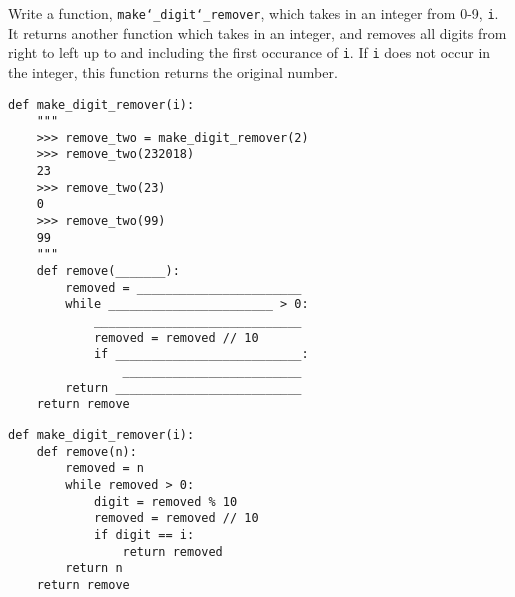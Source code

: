 \begin{blocksection}
\question Write a function, \texttt{make\char`_digit\char`_remover}, which takes in an integer from 0-9, \texttt{i}. It returns another function which takes in an integer, and removes all digits from right to left up to and including the first occurance of \texttt{i}. If \texttt{i} does not occur in the integer, this function returns the original number. \\

\begin{lstlisting}
def make_digit_remover(i):
    """
    >>> remove_two = make_digit_remover(2)
    >>> remove_two(232018)
    23
    >>> remove_two(23)
    0
    >>> remove_two(99)
    99
    """
    def remove(_______):
    	removed = _______________________
        while _______________________ > 0:
            _____________________________
            removed = removed // 10
            if __________________________:
                _________________________
        return __________________________
    return remove
\end{lstlisting}

\begin{solution}
\begin{lstlisting}
def make_digit_remover(i):
    def remove(n):
        removed = n
        while removed > 0:
            digit = removed % 10
            removed = removed // 10
            if digit == i:
                return removed
        return n
    return remove
\end{lstlisting}
\end{solution}
\end{blocksection}
